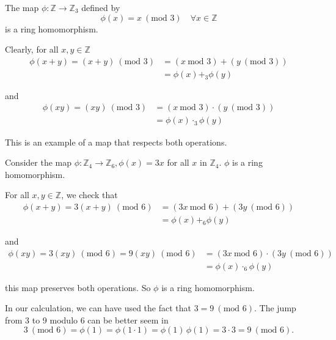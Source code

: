 \begin{example}
    The map $\phi: \mathbb{Z} \to \mathbb{Z}_3$ defined by 
    \[
        \phi(x) = x \> (\text{mod }3) \quad \forall x \in \mathbb{Z}
    \]
    is a ring homomorphism.
\end{example}
\begin{solution}
    Clearly, for all $x, y \in \mathbb{Z}$
    \begin{align*}
        \phi(x + y) = (x + y) \> (\text{mod }3) &= (x \> \text{mod }3) + (y \> (\text{mod }3))\\
        &= \phi(x) +_3 \phi(y)
    \end{align*}

    and 
    \begin{align*}
        \phi(xy) = (xy) \> (\text{mod }3) &= (x \> \text{mod }3) \cdot (y \> (\text{mod }3))\\
        &= \phi(x) \cdot_3 \phi(y)
    \end{align*}

    This is an example of a map that respects both operations.
\end{solution}

\begin{example}
    Consider the map $\phi: \mathbb{Z}_4 \to \mathbb{Z}_6, \phi(x) = 3x$ for all $x$ in 
    $\mathbb{Z}_4$. $\phi$ is a ring homomorphism.
\end{example}
\begin{solution}
    For all $x, y \in \mathbb{Z}$, we check that
    \begin{align*}
        \phi(x + y) = 3(x + y) \> (\text{mod }6) &= (3x \> \text{mod }6) + (3y \> (\text{mod }6))\\
        &= \phi(x) +_6 \phi(y)
    \end{align*}

    and 
    \begin{align*}
        \phi(xy) = 3(xy) \> (\text{mod }6) = 9(xy) \> (\text{mod }6) &= (3x \> \text{mod }6) \cdot (3y \> (\text{mod }6))\\
        &= \phi(x) \cdot_6 \phi(y)
    \end{align*}

    this map preserves both operations. So $\phi$ is a ring homomorphism.

    In our calculation, we can have used the fact that $3 = 9 \> (\text{mod }6)$. The jump from 3 to 9 modulo 6 
    can be better seem in 
    \[
        3 \> (\text{mod }6) = \phi(1) = \phi(1 \cdot 1) = \phi(1)\, \phi(1) = 3 \cdot 3 = 9 \> (\text{mod }6).
    \]
\end{solution}

